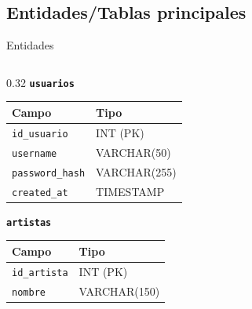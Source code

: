 \documentclass[aspectratio=169, 10pt]{beamer}
\begin{document}
\subsection{Entidades/Tablas principales}
\begin{frame}[t]{Entidades}
    \centering
    \footnotesize
    \setlength{\tabcolsep}{3pt}
    \renewcommand{\arraystretch}{0.95}

    \begin{columns}[T]
        \begin{column}{0.32\textwidth}
            \centering
            \textbf{\texttt{usuarios}}\par\vspace{0.05cm}
            \begin{tabular}{ll}
                \toprule
                \textbf{Campo} & \textbf{Tipo} \\
                \midrule
                \texttt{id\_usuario} & INT (PK) \\
                \texttt{username} & VARCHAR(50) \\
                \texttt{password\_hash} & VARCHAR(255) \\
                \texttt{created\_at} & TIMESTAMP \\
                \bottomrule
            \end{tabular}

            \vspace{0.25cm}
            \textbf{\texttt{artistas}}\par\vspace{0.05cm}
            \begin{tabular}{ll}
                \toprule
                \textbf{Campo} & \textbf{Tipo} \\
                \midrule
                \texttt{id\_artista} & INT (PK) \\
                \texttt{nombre} & VARCHAR(150) \\
                \bottomrule
            \end{tabular}
        \end{column}


\end{columns}
\end{frame}
\end{document}
